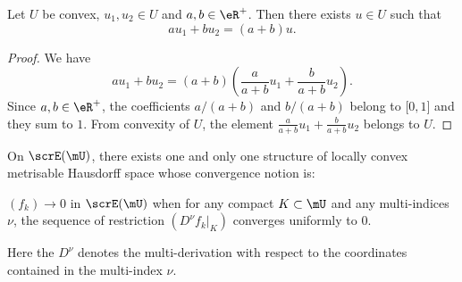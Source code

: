 \begin{lemma}   \label{LEMooAHUMooBwxzPj}
	Let \( U\) be convex, \( u_1, u_2\in U\) and \( a,b\in \eR^+\). Then there exists \( u\in U\) such that
	\begin{equation}
		au_1+bu_2=(a+b)u.
	\end{equation}
\end{lemma}

\begin{proof}
	We have
	\begin{equation}
		au_1+bu_2=(a+b)\left( \frac{ a }{ a+b }u_1+\frac{ b }{ a+b }u_2 \right).
	\end{equation}
	Since \( a,b\in \eR^+\), the coefficients \( a/(a+b)\) and \( b/(a+b)\) belong to \( \mathopen[ 0 , 1 \mathclose]\) and they sum to \( 1\). From convexity of \( U\), the element \( \frac{ a }{ a+b }u_1+\frac{ b }{ a+b }u_2\) belongs to \( U\).
\end{proof}

\begin{proposition}    \label{prop:topo_E}
	On $\scrE(\mU)$, there exists one and only one structure of locally convex metrisable Hausdorff space whose convergence notion is:

	$(f_k)\to 0$ in $\scrE(\mU)$ when for any compact $K\subset\mU$ and any multi-indices $\nu$, the sequence of restriction $(D^{\nu}f_k|_K)$ converges uniformly to $0$.

	Here the $D^{\nu}$ denotes the multi-derivation with respect to the coordinates contained in the multi-index $\nu$.
\end{proposition}

